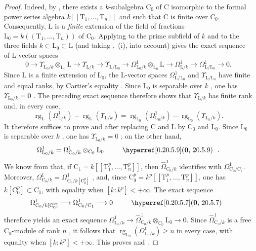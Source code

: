\begin{proof}
Indeed, by , there exists a $k$-subalgebra $\mathrm{C}_0$ of $\mathrm{C}$ isomorphic to the formal power series algebra $k[[\mathrm{T}_1,\ldots,\mathrm{T}_n]]$ and such that $\mathrm{C}$ is finite over $\mathrm{C}_0$.
Consequently, $\mathrm{L}$ is a \emph{finite} extension of the field of fractions $\mathrm{L}_0=k((\mathrm{T}_1,\ldots,\mathrm{T}_n))$ of $\mathrm{C}_0$.
Applying  to the prime subfield of $k$ and to the three fields $k\subset\mathrm{L}_0\subset\mathrm{L}$ (and taking ,~(i), into account) gives the exact sequence of $\mathrm{L}$-vector spaces
\[
  0\to\Upsilon_{\mathrm{L}_0/k}\otimes_{\mathrm{L}_0}\mathrm{L}\to\Upsilon_{\mathrm{L}/k}\to\Upsilon_{\mathrm{L}/\mathrm{L}_0}\to\Omega^1_{\mathrm{L}_0/k}\otimes_{\mathrm{L}_0}\mathrm{L}\to\Omega^1_{\mathrm{L}/k}\to\Omega^1_{\mathrm{L}/\mathrm{L}_0}\to 0.
\]
Since $\mathrm{L}$ is a finite extension of $\mathrm{L}_0$, the $\mathrm{L}$-vector spaces $\Omega^1_{\mathrm{L}/\mathrm{L}_0}$ and $\Upsilon_{\mathrm{L}/\mathrm{L}_0}$ have finite and equal ranks, by Cartier's equality . Since $\mathrm{L}_0$ is separable over $k$ , one has $\Upsilon_{\mathrm{L}_0/k}=0$ . The preceding exact sequence therefore shows that $\Upsilon_{\mathrm{L}/k}$ has finite rank and, in every case,
\[
  \operatorname{rg}_{\mathrm{L}}(\Omega^1_{\mathrm{L}/k})-\operatorname{rg}_{\mathrm{L}}(\Upsilon_{\mathrm{L}/k})=\operatorname{rg}_{\mathrm{L}_0}(\Omega^1_{\mathrm{L}_0/k})-\operatorname{rg}_{\mathrm{L}_0}(\Upsilon_{\mathrm{L}_0/k}).
\]
It therefore suffices to prove  and  after replacing $\mathrm{C}$ and $\mathrm{L}$ by $\mathrm{C}_0$ and $\mathrm{L}_0$. Since $\mathrm{L}_0$ is separable over $k$ , one has $\Upsilon_{\mathrm{L}_0/k}=0$ ; on the other hand,
\[
  \Omega^1_{\mathrm{L}_0/k}=\Omega^1_{\mathrm{C}_0/k}\otimes_{\mathrm{C}_0}\mathrm{L}_0
  \qquad\text{\sref[0]{0.20.5.9}.}
\]
We know from  that, if $\mathrm{C}_1=k[[\mathrm{T}_1^p,\ldots,\mathrm{T}_n^p]]$, then $\hat{\Omega}^1_{\mathrm{C}_0/k}$ identifies with $\Omega^1_{\mathrm{C}_0/\mathrm{C}_1}$. Moreover,
$\Omega^1_{\mathrm{C}_0/k}=\Omega^1_{\mathrm{C}_0/k[\mathrm{C}_0^p]}$ , and, since $\mathrm{C}_0^p=k^p[[\mathrm{T}_1^p,\ldots,\mathrm{T}_n^p]]$, one has $k[\mathrm{C}_0^p]\subset\mathrm{C}_1$, with equality when $[k:k^p]<+\infty$. The exact sequence
\[
  \Omega^1_{\mathrm{C}_0/k[\mathrm{C}_0^p]}\longrightarrow\Omega^1_{\mathrm{C}_0/\mathrm{C}_1}\longrightarrow 0
  \qquad\text{\sref[0]{0.20.5.7}}
\]
therefore yields an exact sequence $\Omega^1_{\mathrm{L}_0/k}\to\hat{\Omega}^1_{\mathrm{C}_0/k}\otimes_{\mathrm{C}_0}\mathrm{L}_0\to0$. Since $\hat{\Omega}^1_{\mathrm{C}_0/k}$ is a free $\mathrm{C}_0$-module of rank $n$ , it follows that $\operatorname{rg}_{\mathrm{L}_0}(\Omega^1_{\mathrm{L}_0/k})\geq n$ in every case, with equality when $[k:k^p]<+\infty$. This proves  and .


\end{proof}
